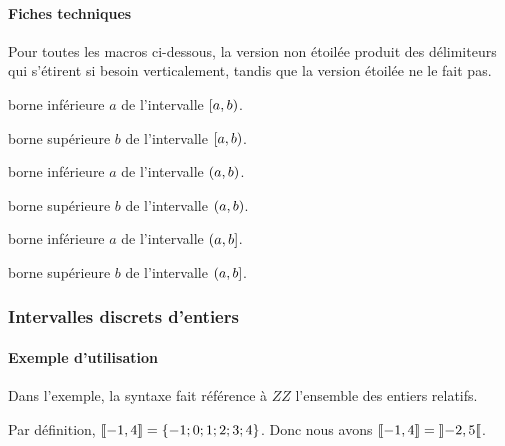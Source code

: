 \documentclass[12pt,a4paper]{article}
\newcommand\ZZ{ZZ}
\begin{document}
\paragraph{Fiches techniques}

Pour toutes les macros ci-dessous, la version non étoilée produit des délimiteurs qui s'étirent si besoin verticalement, tandis que la version étoilée ne le fait pas.


\bigskip





 borne inférieure $a$ de l'intervalle $\intervalCP{a}{b}$.

 borne supérieure $b$ de l'intervalle $\intervalCP{a}{b}$.


\bigskip




 borne inférieure $a$ de l'intervalle $\intervalP{a}{b}$.

 borne supérieure $b$ de l'intervalle $\intervalP{a}{b}$.


\bigskip




 borne inférieure $a$ de l'intervalle $\intervalPC{a}{b}$.

 borne supérieure $b$ de l'intervalle $\intervalPC{a}{b}$.




\subsubsection{Intervalles discrets d'entiers}

\paragraph{Exemple d'utilisation}

Dans l'exemple, la syntaxe fait référence à $\ZZ$ l'ensemble des entiers relatifs.

\begin{tcblisting}{}
Par définition, $\ZintervalC{-1}{4} = \{ -1 ; 0 ; 1 ; 2 ; 3 ; 4 \}$. Donc nous avons
$\ZintervalC{-1}{4} = \ZintervalO{-2}{5}$.
\end{tcblisting}
\end{document}
